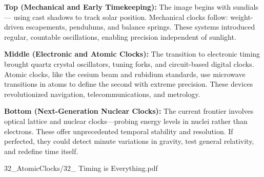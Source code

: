 \begin{SideNotePage}{
  \textbf{Top (Mechanical and Early Timekeeping):}  
  The image begins with sundials — using cast shadows to track solar position. Mechanical clocks follow: weight-driven escapements, pendulums, and balance springs. These systems introduced regular, countable oscillations, enabling precision independent of sunlight. \par

  \textbf{Middle (Electronic and Atomic Clocks):}  
  The transition to electronic timing brought quartz crystal oscillators, tuning forks, and circuit-based digital clocks. Atomic clocks, like the cesium beam and rubidium standards, use microwave transitions in atoms to define the second with extreme precision. These devices revolutionized navigation, telecommunications, and metrology. \par

  \textbf{Bottom (Next-Generation Nuclear Clocks):}  
  The current frontier involves optical lattice and nuclear clocks—probing energy levels in nuclei rather than electrons. These offer unprecedented temporal stability and resolution. If perfected, they could detect minute variations in gravity, test general relativity, and redefine time itself. \par
}{32_AtomicClocks/32_ Timing is Everything.pdf}
\end{SideNotePage}

